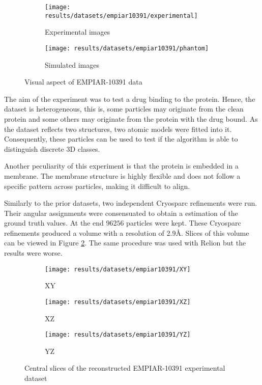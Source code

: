 \documentclass[../main.tex]{subfiles}
\begin{document}
\begin{figure}[htbp]
    \centering
    \begin{subfigure}[b]{0.45\textwidth}
         \centering
         \texttt{[image: results/datasets/empiar10391/experimental]}
         \caption{Experimental images}
    \end{subfigure}
    \hfill
    \begin{subfigure}[b]{0.45\textwidth}
         \centering
         \texttt{[image: results/datasets/empiar10391/phantom]}
         \caption{Simulated images}
    \end{subfigure}
    \caption{Visual aspect of EMPIAR-10391 data}
    \label{fig:5:empiar10391}
\end{figure}

The aim of the experiment was to test a drug binding to the protein. Hence, the dataset is heterogeneous, this is, some particles may originate from the clean protein and some others may originate from the protein with the drug bound. As the dataset reflects two structures, two atomic models were fitted into it. Consequently, these particles can be used to test if the algorithm is able to distinguish discrete 3D classes. 

Another peculiarity of this experiment is that the protein is embedded in a membrane. The membrane structure is highly flexible and does not follow a specific pattern across particles, making it difficult to align.

Similarly to the prior datasets, two independent Cryosparc refinements were run. Their angular assignments were consensuated to obtain a estimation of the ground truth values. At the end $96256$ particles were kept. These Cryosparc refinements produced a volume with a resolution of $2.9\si{\angstrom}$. Slices of this volume can be viewed in Figure \ref{fig:5:empiar10391_rec}. The same procedure was used with Relion but the results were worse.


\begin{figure}[htbp]
    \centering
    \begin{subfigure}[b]{0.3\textwidth}
         \centering
         \texttt{[image: results/datasets/empiar10391/XY]}
         \caption{XY}
    \end{subfigure}
    \hfill
    \begin{subfigure}[b]{0.3\textwidth}
         \centering
         \texttt{[image: results/datasets/empiar10391/XZ]}
         \caption{XZ}
    \end{subfigure}
    \hfill
    \begin{subfigure}[b]{0.3\textwidth}
         \centering
         \texttt{[image: results/datasets/empiar10391/YZ]}
         \caption{YZ}
    \end{subfigure}

    \caption{Central slices of the reconstructed EMPIAR-10391 experimental dataset}
    \label{fig:5:empiar10391_rec}
\end{figure}
\end{document}
